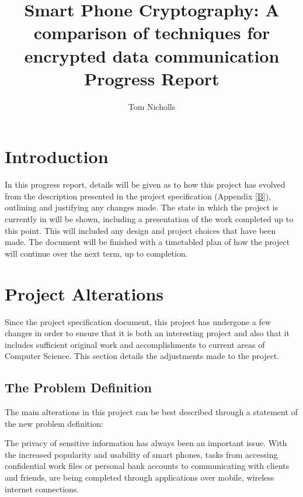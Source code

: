 \documentclass[a4paper,11pt]{article}
\title{Smart Phone Cryptography: A comparison of techniques for encrypted data communication \\ Progress Report}
\author{Tom Nicholls}
\begin{document}
\maketitle
\tableofcontents
\newpage

\section{Introduction}

In this progress report, details will be given as to how this project has evolved from the description presented in the project specification (Appendix \ref{B}), outlining and justifying any changes made. The state in which the project is currently in will be shown, including a presentation of the work completed up to this point. This will included any design and project choices that have been made. The document will be finished with a timetabled plan of how the project will continue over the next term, up to completion.

\section{Project Alterations}

Since the project specification document, this project has undergone a few changes in order to ensure that it is both an interesting project and also that it includes sufficient original work and accomplishments to current areas of Computer Science. This section details the adjustments made to the project.

\subsection{The Problem Definition}  

The main alterations in this project can be best described through a statement of the new problem definition:

The privacy of sensitive information has always been an important issue. With the increased popularity and usability of smart phones, tasks from accessing confidential work files or personal bank accounts to communicating with clients and friends, are being completed through applications over mobile, wireless internet connections. 
\end{document}
